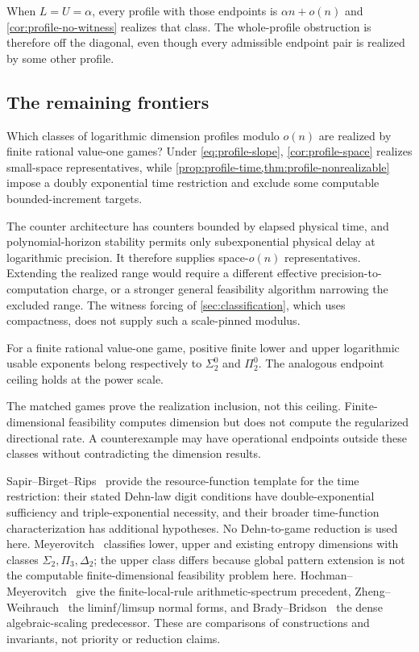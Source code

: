 When $L=U=\alpha$, every profile with those endpoints is $\alpha n+o(n)$ and \cref{cor:profile-no-witness} realizes that class. The whole-profile obstruction is therefore off the diagonal, even though every admissible endpoint pair is realized by some other profile.

\subsection{The remaining frontiers}
\begin{problem}\label{prob:profile-frontier}
Which classes of logarithmic dimension profiles modulo $o(n)$ are realized by finite rational value-one games? Under \eqref{eq:profile-slope}, \cref{cor:profile-space} realizes small-space representatives, while \cref{prop:profile-time,thm:profile-nonrealizable} impose a doubly exponential time restriction and exclude some computable bounded-increment targets.
\end{problem}
The counter architecture has counters bounded by elapsed physical time, and polynomial-horizon stability permits only subexponential physical delay at logarithmic precision. It therefore supplies space-$o(n)$ representatives. Extending the realized range would require a different effective precision-to-computation charge, or a stronger general feasibility algorithm narrowing the excluded range. The witness forcing of \cref{sec:classification}, which uses compactness, does not supply such a scale-pinned modulus.

\begin{conjecture}\label{conj:profile-usable-ceiling}
For a finite rational value-one game, positive finite lower and upper logarithmic usable exponents belong respectively to $\Sigma^0_2$ and $\Pi^0_2$. The analogous endpoint ceiling holds at the power scale.
\end{conjecture}
The matched games prove the realization inclusion, not this ceiling. Finite-dimensional feasibility computes dimension but does not compute the regularized directional rate. A counterexample may have operational endpoints outside these classes without contradicting the dimension results.

Sapir--Birget--Rips~\cite{SBR02} provide the resource-function template for the time restriction: their stated Dehn-law digit conditions have double-exponential sufficiency and triple-exponential necessity, and their broader time-function characterization has additional hypotheses. No Dehn-to-game reduction is used here. Meyerovitch~\cite[Theorem~5.1]{Mey11} classifies lower, upper and existing entropy dimensions with classes $\Sigma_2,\Pi_3,\Delta_2$; the upper class differs because global pattern extension is not the computable finite-dimensional feasibility problem here. Hochman--Meyerovitch~\cite{HM10} give the finite-local-rule arithmetic-spectrum precedent, Zheng--Weihrauch~\cite{ZW01} the liminf/limsup normal forms, and Brady--Bridson~\cite{BB00} the dense algebraic-scaling predecessor. These are comparisons of constructions and invariants, not priority or reduction claims.
